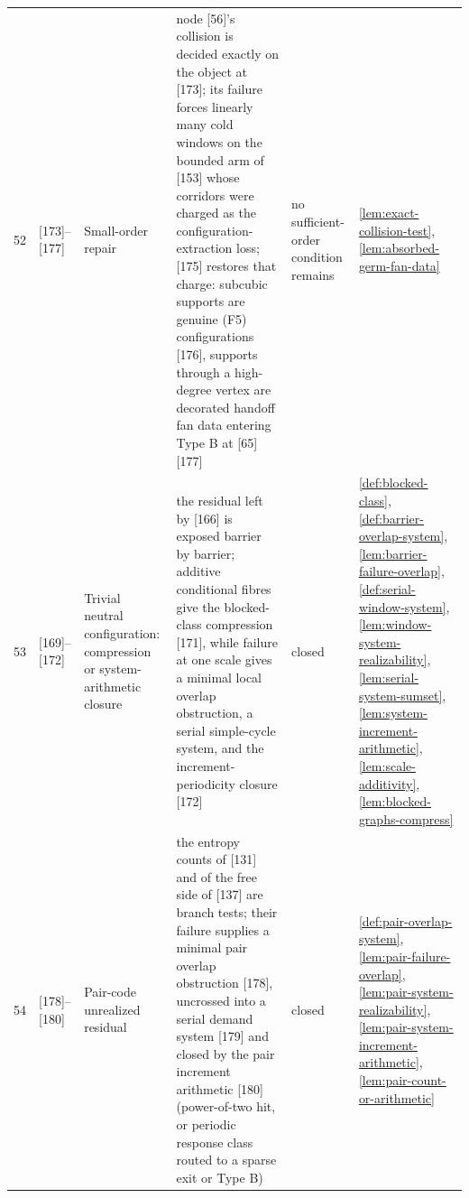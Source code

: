 \documentclass[11pt]{article}
\begin{document}
{\begin{longtable}{C{0.04\textwidth} L{0.13\textwidth} L{0.17\textwidth} L{0.25\textwidth} L{0.21\textwidth} L{0.12\textwidth}}
52 & [173]--[177] & Small-order repair & node [56]'s collision is decided exactly on the object at [173]; its failure forces linearly many cold windows on the bounded arm of [153] whose corridors were charged as the configuration-extraction loss; [175] restores that charge: subcubic supports are genuine (F5) configurations [176], supports through a high-degree vertex are decorated handoff fan data entering Type B at [65] [177] & no sufficient-order condition remains & \cref{lem:exact-collision-test}, \cref{lem:absorbed-germ-fan-data} \\
53 & [169]--[172] & Trivial neutral configuration: compression or system-arithmetic closure & the residual left by [166] is exposed barrier by barrier; additive conditional fibres give the blocked-class compression [171], while failure at one scale gives a minimal local overlap obstruction, a serial simple-cycle system, and the increment-periodicity closure [172] & closed & \cref{def:blocked-class}, \cref{def:barrier-overlap-system}, \cref{lem:barrier-failure-overlap}, \cref{def:serial-window-system}, \cref{lem:window-system-realizability}, \cref{lem:serial-system-sumset}, \cref{lem:system-increment-arithmetic}, \cref{lem:scale-additivity}, \cref{lem:blocked-graphs-compress} \\
54 & [178]--[180] & Pair-code unrealized residual & the entropy counts of [131] and of the free side of [137] are branch tests; their failure supplies a minimal pair overlap obstruction [178], uncrossed into a serial demand system [179] and closed by the pair increment arithmetic [180] (power-of-two hit, or periodic response class routed to a sparse exit or Type B) & closed & \cref{def:pair-overlap-system}, \cref{lem:pair-failure-overlap}, \cref{lem:pair-system-realizability}, \cref{lem:pair-system-increment-arithmetic}, \cref{lem:pair-count-or-arithmetic} \\

\end{longtable}}
\end{document}
